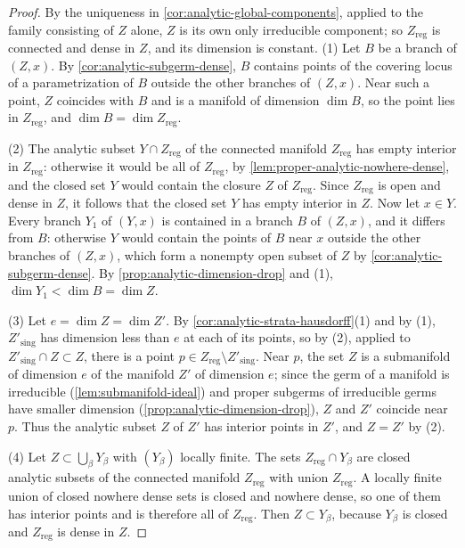 \begin{proof}
By the uniqueness in \cref{cor:analytic-global-components}, applied to the family consisting of $Z$ alone, $Z$ is its own only irreducible component; so $Z_{\mathrm{reg}}$ is connected and dense in $Z$, and its dimension is constant. (1) Let $B$ be a branch of $(Z,x)$. By \cref{cor:analytic-subgerm-dense}, $B$ contains points of the covering locus of a parametrization of $B$ outside the other branches of $(Z,x)$. Near such a point, $Z$ coincides with $B$ and is a manifold of dimension $\dim B$, so the point lies in $Z_{\mathrm{reg}}$, and $\dim B=\dim Z_{\mathrm{reg}}$.

(2) The analytic subset $Y\cap Z_{\mathrm{reg}}$ of the connected manifold $Z_{\mathrm{reg}}$ has empty interior in $Z_{\mathrm{reg}}$: otherwise it would be all of $Z_{\mathrm{reg}}$, by \cref{lem:proper-analytic-nowhere-dense}, and the closed set $Y$ would contain the closure $Z$ of $Z_{\mathrm{reg}}$. Since $Z_{\mathrm{reg}}$ is open and dense in $Z$, it follows that the closed set $Y$ has empty interior in $Z$. Now let $x\in Y$. Every branch $Y_1$ of $(Y,x)$ is contained in a branch $B$ of $(Z,x)$, and it differs from $B$: otherwise $Y$ would contain the points of $B$ near $x$ outside the other branches of $(Z,x)$, which form a nonempty open subset of $Z$ by \cref{cor:analytic-subgerm-dense}. By \cref{prop:analytic-dimension-drop} and (1), $\dim Y_1<\dim B=\dim Z$.

(3) Let $e=\dim Z=\dim Z'$. By \cref{cor:analytic-strata-hausdorff}(1) and by (1), $Z'_{\mathrm{sing}}$ has dimension less than $e$ at each of its points, so by (2), applied to $Z'_{\mathrm{sing}}\cap Z\subset Z$, there is a point $p\in Z_{\mathrm{reg}}\setminus Z'_{\mathrm{sing}}$. Near $p$, the set $Z$ is a submanifold of dimension $e$ of the manifold $Z'$ of dimension $e$; since the germ of a manifold is irreducible (\cref{lem:submanifold-ideal}) and proper subgerms of irreducible germs have smaller dimension (\cref{prop:analytic-dimension-drop}), $Z$ and $Z'$ coincide near $p$. Thus the analytic subset $Z$ of $Z'$ has interior points in $Z'$, and $Z=Z'$ by (2).

(4) Let $Z\subset\bigcup_\beta Y_\beta$ with $(Y_\beta)$ locally finite. The sets $Z_{\mathrm{reg}}\cap Y_\beta$ are closed analytic subsets of the connected manifold $Z_{\mathrm{reg}}$ with union $Z_{\mathrm{reg}}$. A locally finite union of closed nowhere dense sets is closed and nowhere dense, so one of them has interior points and is therefore all of $Z_{\mathrm{reg}}$. Then $Z\subset Y_\beta$, because $Y_\beta$ is closed and $Z_{\mathrm{reg}}$ is dense in $Z$.
\end{proof}

